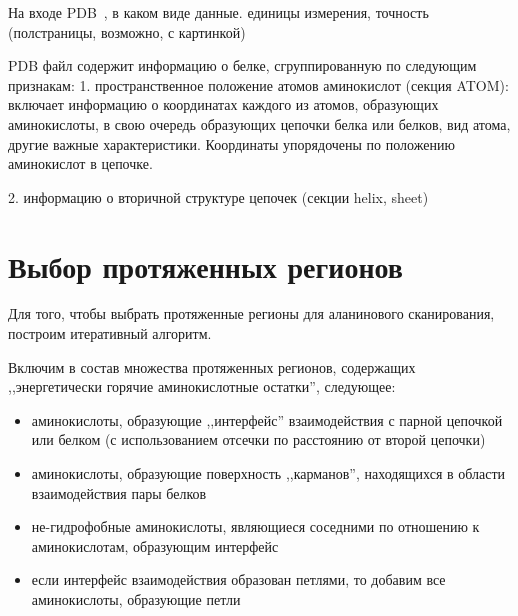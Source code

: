 На входе PDB~\cite{pdb}, в каком виде данные. единицы измерения, точность
(полстраницы, возможно, с картинкой)


PDB файл содержит информацию о белке, сгруппированную по следующим признакам: 
1. пространственное положение атомов аминокислот (секция ATOM):
включает информацию о координатах каждого из атомов, образующих аминокислоты, в свою очередь образующих цепочки белка или белков, вид атома, другие важные характеристики. Координаты упорядочены по положению аминокислот в цепочке.

2. информацию о вторичной структуре цепочек (секции helix, sheet)



\section{Выбор протяженных регионов}
Для того, чтобы выбрать протяженные регионы для аланинового сканирования, построим итеративный алгоритм.

Включим в состав множества протяженных регионов, содержащих ,,энергетически горячие аминокислотные остатки'', следующее:
\begin{itemize}
\item аминокислоты, образующие ,,интерфейс'' взаимодействия с парной цепочкой или белком (с использованием отсечки по расстоянию от второй цепочки)
\item аминокислоты, образующие поверхность ,,карманов'', находящихся в области взаимодействия пары белков
\item не-гидрофобные аминокислоты, являющиеся соседними по отношению к аминокислотам, образующим интерфейс
\item если интерфейс взаимодействия образован петлями, то добавим все аминокислоты, образующие петли 
\end{itemize}


